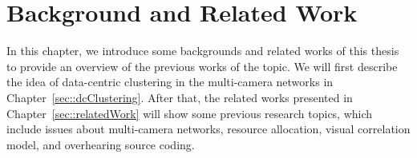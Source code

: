 \section{Background and Related Work}
\label{sec::backgroundAndRelatedWork}
In this chapter, we introduce some backgrounds and related works of this thesis to provide an overview of the previous works of the topic.
We will first describe the idea of data-centric clustering in the multi-camera networks in Chapter~\ref{sec::dcClustering}.
After that, the related works presented in Chapter~\ref{sec::relatedWork} will show some previous research topics, which include issues about multi-camera networks, resource allocation, visual correlation model, and overhearing source coding.

